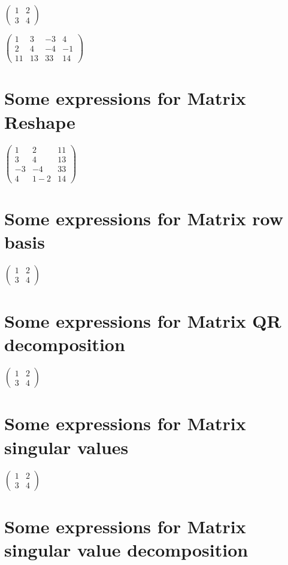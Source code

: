 \documentclass{article}
\begin{document}
$\left( 
\begin{array}{cc}
1 & 2 \\ 
3 & 4%
\end{array}%
\right) $

$\left( 
\begin{array}{cccc}
1 & 3 & -3 & 4 \\ 
2 & 4 & -4 & -1 \\ 
11 & 13 & 33 & 14%
\end{array}%
\right) $

\section{Some expressions for Matrix Reshape}

$\left( 
\begin{array}{ccc}
1 & 2 & 11 \\ 
3 & 4 & 13 \\ 
-3 & -4 & 33 \\ 
4 & 1-2 & 14%
\end{array}%
\right) $

\section{Some expressions for Matrix row basis}

$\left( 
\begin{array}{cc}
1 & 2 \\ 
3 & 4%
\end{array}%
\right) $

\section{Some expressions for Matrix QR decomposition}

$\left( 
\begin{array}{cc}
1 & 2 \\ 
3 & 4%
\end{array}%
\right) $

\section{Some expressions for Matrix singular values}

$\left( 
\begin{array}{cc}
1 & 2 \\ 
3 & 4%
\end{array}%
\right) $

\section{Some expressions for Matrix singular value decomposition}
\end{document}
